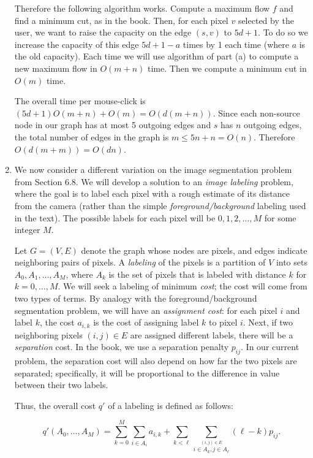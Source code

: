 \documentclass[12pt]{article}
\begin{document}
\begin{enumerate}
{Therefore the following algorithm works.
Compute a maximum flow $f$ and find a minimum cut, as in the book.
Then, for each pixel $v$ selected by the user, we want to
raise the capacity on the edge $(s,v)$ to $5d + 1$.
To do so we increase the capacity of this edge $5d + 1-a$ times by 1 each time
(where $a$ is the old capacity). Each time we will use algorithm of part (a) to
compute a new maximum flow in $O(m+n)$ time.
Then we compute a minimum cut in $O(m)$ time.

The overall time per mouse-click is $(5d+1)O(m+n)+O(m)=O(d(m+n))$.
Since each non-source node in our graph has at most 5 outgoing edges
and $s$ has $n$ outgoing edges, the total number of edges in the graph is
$m\le 5n+n=O(n)$. Therefore $O(d(m+m))=O(dn)$.

}


\item

We now consider a different variation on the
image segmentation problem from Section 6.8.
We will develop a solution to an {\em image labeling} problem,
where the goal is to label each pixel with a rough
estimate of its distance from the camera
(rather than the simple {\em foreground/background}
labeling used in the text).
The possible labels for each pixel will be
$0, 1, 2, \ldots, M$ for some integer $M$.

Let $G=(V,E)$ denote the graph whose nodes are pixels, and edges
indicate neighboring pairs of pixels. A {\em labeling}
of the pixels is a partition
of $V$ into sets $A_0, A_1, \ldots, A_M$,
where $A_k$ is the set of pixels that
is labeled with distance $k$ for $k=0, \ldots, M$.
We will seek a labeling of minimum {\em cost};
the cost will come from two types of terms.
By analogy with the foreground/background
segmentation problem, we will have an {\em assignment cost}:
for each pixel $i$ and label $k$, the cost $a_{i,k}$ is the
cost of assigning label $k$ to pixel $i$.
Next, if two neighboring pixels
$(i,j)\in E$ are assigned different labels, there will be a
{\em separation} cost. In the book, we use a separation
penalty $p_{ij}$. In our current problem, the separation
cost will also depend on how far the two pixels
are separated; specifically, it will be proportional
to the difference in value between their two labels.

Thus, the overall cost $q'$ of a labeling is defined as follows:

$$q'(A_0,\ldots,A_M)=\sum_{k=0}^M \sum_{i \in A_i} a_{i,k} +
\sum_{k<\ell}
\sum_{\stackrel{(i,j) \in E}{i\in A_k, j \in A_\ell}} (\ell-k)p_{ij}.$$


\end{enumerate}
\end{document}
